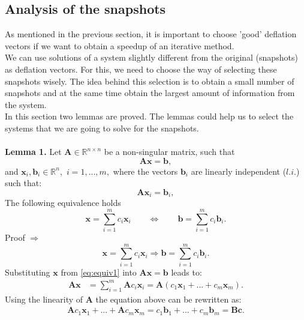\documentclass[12pt]{article}
\begin{document}
\subsection{Analysis of the snapshots}
As mentioned in the previous section, it is important to choose 'good' deflation vectors if we want to
obtain a speedup of an iterative method.\\ 
We can use solutions of a system slightly different from the original (snapshots) as deflation vectors.
For this, we need to choose the way of selecting these snapshots
wisely. The idea behind this selection is to obtain a small number of snapshots and at the same time
obtain the largest amount of information from the system.\\
In this section two lemmas are proved. The lemmas could help us to select the systems that we are going to solve for
the snapshots.\\\\
\textbf{Lemma 1.} 
Let $\mathbf{A} \in \mathbb{R}^{n\times n}$ be a non-singular matrix, such that
\begin{equation}\label{eq:ls}
\mathbf{A}\mathbf{x}=\mathbf{b},
\end{equation}
and $ \mathbf{x}_i, \mathbf{b}_i \in \mathbb{R}^{n},$ $i=1,...,m,$ where the vectors $\mathbf{b}_i$ are 
linearly independent ($l.i.$) such that: 
\begin{equation}\label{eq:lieq}
\mathbf{A}\mathbf{x}_i=\mathbf{b}_i,
\end{equation}
The following equivalence holds
\begin{equation}\label{eq:equiv}
\mathbf{x}=\sum_{i=1}^m {c}_i\mathbf{x}_i \qquad
\Leftrightarrow \qquad
\mathbf{b}=\sum_{i=1}^m {c}_i\mathbf{b}_i.
\end{equation}
Proof $\Rightarrow$
\begin{equation}\label{eq:equiv1}
\mathbf{x}=\sum_{i=1}^m {c}_i\mathbf{x}_i 
\Rightarrow 
\mathbf{b}=\sum_{i=1}^m {c}_i\mathbf{b}_i.
\end{equation}
Substituting $\mathbf{x}$ from \eqref{eq:equiv1} into $\mathbf{A}\mathbf{x}=\mathbf{b}$ leads to:
\begin{align*}
\mathbf{A}\mathbf{x}&=\sum_{i=1}^m \mathbf{A}{c}_i\mathbf{x}_i=\mathbf{A}(c_1\mathbf{x}_1+...+c_m\mathbf{x}_m).
\end{align*}
Using the linearity of $\mathbf{A}$ the equation above can be rewritten as:
\begin{align}\label{eq:bc}
\mathbf{A}c_1\mathbf{x}_1+...+\mathbf{A}c_m\mathbf{x}_m
=c_1\mathbf{b}_1+...+c_m\mathbf{b}_m=\mathbf{B}\mathbf{c}.
\end{align}
\end{document}
